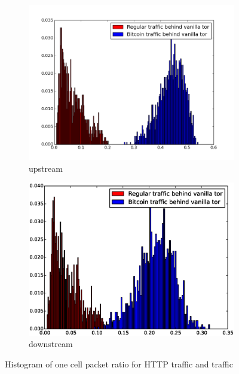 \begin{figure}
\centering
\begin{subfigure}{0.48\linewidth}
\centering
\includegraphics[width=\linewidth]{image/ratio_609_upstream_compact_vanilla_tor.png}
\caption{upstream}
\label{fig:ratio_609_upstream_compact_vanilla_tor}
\end{subfigure}
\begin{subfigure}{0.48\linewidth}
\centering
\includegraphics[width=\linewidth]{image/ratio_609_downstream_compact_vanilla_tor.eps}
\caption{downstream}
\label{fig:ratio_609_downstream_compact_vanilla_tor}
\end{subfigure}
\caption{Histogram of one cell packet ratio for HTTP traffic and \bc traffic}
\end{figure}

